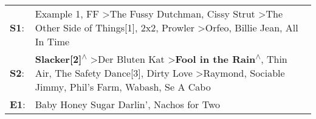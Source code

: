 \begin{supertabular}{p{0.03\textwidth}p{0.92\textwidth}}
 \textbf{S1}:  &                                                                                     Example 1\textsuperscript{}, \enspace FF\textsuperscript{} \textgreater \enspace The Fussy Dutchman\textsuperscript{}, \enspace Cissy Strut\textsuperscript{} \textgreater \enspace The Other Side of Things[1]\textsuperscript{}, \enspace 2x2\textsuperscript{}, \enspace Prowler\textsuperscript{} \textgreater \enspace Orfeo\textsuperscript{}, \enspace Billie Jean\textsuperscript{}, \enspace All In Time\textsuperscript{}  \enspace  \\
 \textbf{S2}:  &  \textbf{Slacker[2]\textsuperscript{$\wedge$}} \textgreater \enspace Der Bluten Kat\textsuperscript{} \textgreater \enspace \textbf{Fool in the Rain\textsuperscript{$\wedge$}}, \enspace Thin Air\textsuperscript{}, \enspace The Safety Dance[3]\textsuperscript{}, \enspace Dirty Love\textsuperscript{} \textgreater \enspace Raymond\textsuperscript{}, \enspace Sociable Jimmy\textsuperscript{}, \enspace Phil's Farm\textsuperscript{}, \enspace Wabash\textsuperscript{}, \enspace Se A Cabo\textsuperscript{}  \enspace  \\
 \textbf{E1}:  &                                                                                                                                                                                                                                                                                                                                                                                                                                   Baby Honey Sugar Darlin'\textsuperscript{}, \enspace Nachos for Two\textsuperscript{}  \enspace  \\
\end{supertabular}
